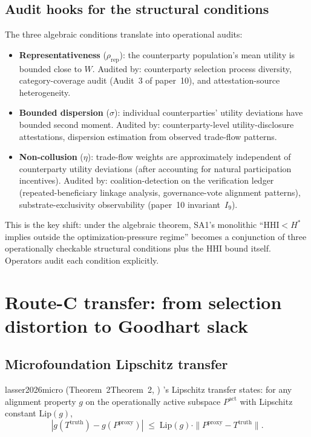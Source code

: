 \documentclass{article}
\makeatletter
\newcommand{\citep}[2][]{%
  \begingroup
  \def\@tmpkey{#2}%
  \ifx\@tmpkey\@empty\else
    (\ifx\@empty#1\@empty\else #1, \fi
     \@nameuse{bibkey@\@tmpkey})%
  \fi
  \endgroup
}
\newcommand{\HHI}{\mathrm{HHI}}
\newcommand{\Pproxy}{P^{\mathrm{proxy}}}
\newcommand{\Ttruth}{T^{\mathrm{truth}}}
\newcommand{\Lip}{\mathrm{Lip}}
\makeatother
\begin{document}
\subsection{Audit hooks for the structural conditions}

The three algebraic conditions translate into operational audits:

\begin{itemize}
\item \textbf{Representativeness} ($\rho_\mathrm{rep}$): the
  counterparty population's mean utility is bounded close to
  $W$.  Audited by: counterparty selection process diversity,
  category-coverage audit (Audit~3 of paper~10), and
  attestation-source heterogeneity.

\item \textbf{Bounded dispersion} ($\sigma$): individual
  counterparties' utility deviations have bounded second moment.
  Audited by: counterparty-level utility-disclosure attestations,
  dispersion estimation from observed trade-flow patterns.

\item \textbf{Non-collusion} ($\eta$): trade-flow weights are
  approximately independent of counterparty utility deviations
  (after accounting for natural participation incentives).
  Audited by: coalition-detection on the verification ledger
  (repeated-beneficiary linkage analysis, governance-vote
  alignment patterns), substrate-exclusivity observability
  (paper~10 invariant~$I_9$).
\end{itemize}

This is the key shift: under the algebraic theorem, SA1's monolithic
``$\HHI < H^*$ implies outside the optimization-pressure regime''
becomes a conjunction of three operationally checkable structural
conditions plus the HHI bound itself.  Operators audit each
condition explicitly.

\section{Route-C transfer: from selection distortion to Goodhart slack}
\label{sec:routeC}

\subsection{Microfoundation Lipschitz transfer}

\citep[Theorem~2]{lasser2026micro}'s Lipschitz transfer states: for
any alignment property $g$ on the operationally active subspace
$P^\mathrm{act}$ with Lipschitz constant $\Lip(g)$,
\begin{equation}
\label{eq:lip-transfer}
  |g(\Ttruth) - g(\Pproxy)| \;\leq\; \Lip(g) \cdot \|\Pproxy - \Ttruth\|.
\end{equation}
\end{document}
